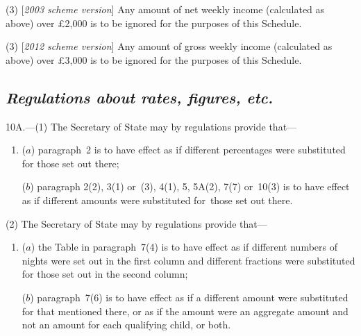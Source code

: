 \documentclass[12pt,a4paper]{article}
\begin{document}
(3) [\emph{2003 scheme version}] Any amount of net weekly income (calculated as above) over £2,000 is to be ignored for the purposes of this Schedule.

(3) [\emph{2012 scheme version}] Any amount of 
gross  %
weekly income (calculated as above) over £3,000 is to be ignored for the purposes of this Schedule.


\subsection*{\itshape Regulations about rates, figures, etc.}

10A.---(1) The Secretary of State may by regulations provide that—
\begin{enumerate}\item[]
($a$) paragraph~2 is to have effect as if different percentages were substituted for those set out there;

($b$) paragraph
2(2),  %
3(1)  or~(3), 4(1), 5, 
5A(2),  %
7(7)  or~10(3)  is to have effect as if different amounts were substituted for~those set out there.
\end{enumerate}

(2) The Secretary of State may by regulations provide that—
\begin{enumerate}\item[]
($a$) the Table in paragraph~7(4)  is to have effect as if different numbers of nights were set out in the first column and different fractions were substituted for those set out in the second column;

($b$) paragraph~7(6)  is to have effect as if a different amount were substituted for that mentioned there, or as if the amount were an aggregate amount and not an amount for each qualifying child, or both.
\end{enumerate}
\end{document}
